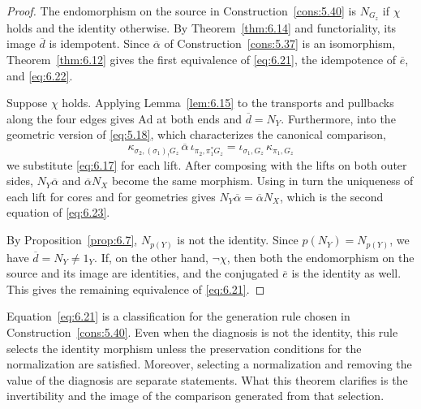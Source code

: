 \begin{proof}

The endomorphism on the source in Construction~\ref{cons:5.40} is $N_{G_z}$ if $\chi$ holds
and the identity otherwise.
By Theorem~\ref{thm:6.14} and functoriality, its image $\overline d$ is idempotent.
Since $\overline\alpha$ of Construction~\ref{cons:5.37} is an isomorphism,
Theorem~\ref{thm:6.12} gives the first equivalence of \eqref{eq:6.21}, the idempotence of
$\overline e$, and \eqref{eq:6.22}.

Suppose $\chi$ holds. Applying Lemma~\ref{lem:6.15} to the transports and pullbacks along
the four edges gives $\mathrm{Ad}$ at both ends and $\overline d=N_Y$.
Furthermore, into the geometric version of \eqref{eq:5.18}, which characterizes the
canonical comparison,
\begin{equation*}
\kappa_{\sigma_2,(\sigma_1)_!G_z}\,
\overline\alpha\,\iota_{\pi_2,\pi_1^*G_z}
=\iota_{\sigma_1,G_z}\,\kappa_{\pi_1,G_z}
\tag{6.24}\label{eq:6.24}
\end{equation*}
we substitute \eqref{eq:6.17} for each lift.
After composing with the lifts on both outer sides, $N_Y\overline\alpha$ and
$\overline\alpha N_X$ become the same morphism.
Using in turn the uniqueness of each lift for cores and for geometries gives
$N_Y\overline\alpha=\overline\alpha N_X$, which is the second equation of \eqref{eq:6.23}.

By Proposition~\ref{prop:6.7}, $N_{p(Y)}$ is not the identity.
Since $p(N_Y)=N_{p(Y)}$, we have $\overline d=N_Y\ne1_Y$.
If, on the other hand, $\neg\chi$, then both the endomorphism on the source and its image
are identities, and the conjugated $\overline e$ is the identity as well. This gives the
remaining equivalence of \eqref{eq:6.21}.

\end{proof}

Equation~\eqref{eq:6.21} is a classification for the generation rule chosen in
Construction~\ref{cons:5.40}.
Even when the diagnosis is not the identity, this rule selects the identity morphism unless
the preservation conditions for the normalization are satisfied.
Moreover, selecting a normalization and removing the value of the diagnosis are
separate statements.
What this theorem clarifies is the invertibility and the image of the comparison generated
from that selection.

